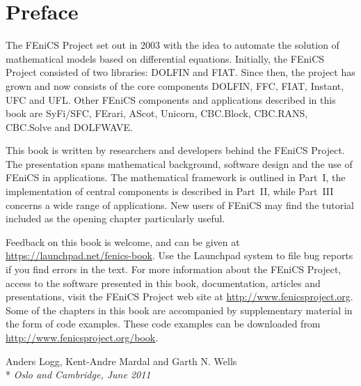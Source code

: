 \tableofcontents


\chapter*{Preface}

\thispagestyle{empty}

The FEniCS Project set out in 2003 with the idea to automate the
solution of mathematical models based on differential equations.
Initially, the FEniCS Project consisted of two libraries: DOLFIN and
FIAT. Since then, the project has grown and now consists of the core
components DOLFIN, FFC, FIAT, Instant, UFC and UFL. Other FEniCS
components and applications described in this book are SyFi/SFC,
FErari, AScot, Unicorn, CBC.Block, CBC.RANS, CBC.Solve and DOLFWAVE.

This book is written by researchers and developers behind the FEniCS
Project. The presentation spans mathematical background, software
design and the use of FEniCS in applications. The mathematical
framework is outlined in Part~I, the implementation of central
components is described in Part~II, while Part~III concerns a wide
range of applications. New users of FEniCS may find the tutorial
included as the opening chapter particularly useful.

Feedback on this book is welcome, and can be given at
\url{https://launchpad.net/fenics-book}. Use the Launchpad system to
file bug reports if you find errors in the text. For more information
about the FEniCS Project, access to the software presented in this
book, documentation, articles and presentations, visit the FEniCS
Project web site at \url{http://www.fenicsproject.org}. Some of the
chapters in this book are accompanied by supplementary material in the
form of code examples. These code examples can be downloaded from
\url{http://www.fenicsproject.org/book}.

\vspace{1em}

\noindent
Anders Logg, Kent-Andre Mardal and Garth N. Wells \\*
\emph{Oslo and Cambridge, June 2011}

